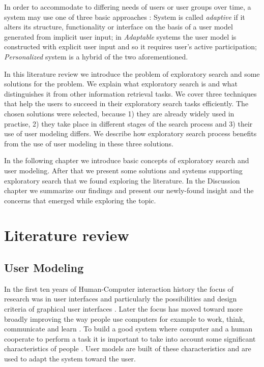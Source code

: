 \documentclass{sigchi}
\begin{document}
In order to accommodate to differing needs of users or user groups over time, a system may use one of three basic approaches \cite{van08}: System is called \textit{adaptive} if it alters its structure, functionality or interface on the basis of a user model generated from implicit user input; in \textit{Adaptable} systems the user model is constructed with explicit user input and so it requires user's active participation; \textit{Personalized} system is a hybrid of the two aforementioned. 

In this literature review we introduce the problem of exploratory search and some solutions for the problem. We explain what exploratory search is and what distinguishes it from other information retrieval tasks. We cover three techniques that help the users to succeed in their exploratory search tasks efficiently. The chosen solutions were selected, because 1) they are already widely used in practise, 2) they take place in different stages of the search process and 3) their use of user modeling differs. We describe how exploratory search process benefits from the use of user modeling in these three solutions.

In the following chapter we introduce basic concepts of exploratory search and user modeling. After that we present some solutions and systems supporting exploratory search that we found exploring the literature. In the Discussion chapter we summarize our findings and present our newly-found insight and the concerns that emerged while exploring the topic.


\section{Literature review}
\label{sec:litreview}



\subsection{User Modeling}

In the first ten years of Human-Computer interaction history the focus of research was in user interfaces and particularly the possibilities and design criteria of graphical user interfaces \cite{fischer01}. Later the focus has moved toward more broadly improving the way people use computers for example to work, think, communicate and learn \cite{fischer01}. To build a good system where computer and a human cooperate to perform a task it is important to take into account some significant characteristics of people \cite{rich99}. User models are built of these characteristics and are used to adapt the system toward the user.
\end{document}
